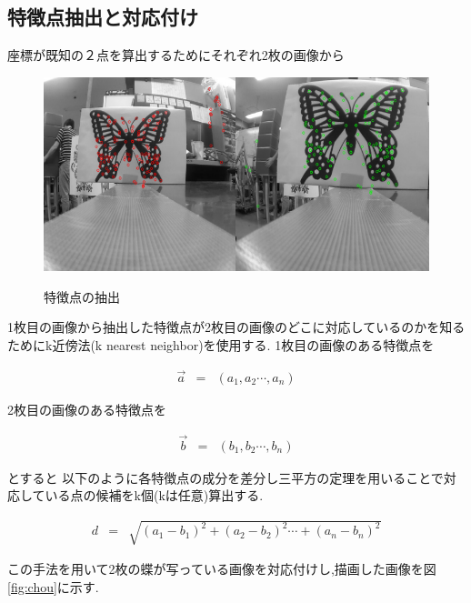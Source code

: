 \documentclass[12pt,oneside]{sotsuken_paper}
\begin{document}
\subsection{特徴点抽出と対応付け}
座標が既知の２点を算出するためにそれぞれ2枚の画像から

\begin{figure}[htp]
 \begin{center}
  \includegraphics[width=120mm]{img/soft/surf.png}
 　\caption{特徴点の抽出}
  \label{fig:surf}%
 \end{center}
\end{figure}

1枚目の画像から抽出した特徴点が2枚目の画像のどこに対応しているのかを知るためにk近傍法(k nearest neighbor)を使用する.
1枚目の画像のある特徴点を

\begin{eqnarray}
	\vec{a}  & = & (a_1, a_2 \cdots, a_n)
\end{eqnarray}

2枚目の画像のある特徴点を

\begin{eqnarray}
	\vec{b}  & = & (b_1, b_2 \cdots, b_n)
\end{eqnarray}

とすると
以下のように各特徴点の成分を差分し三平方の定理を用いることで対応している点の候補をk個(kは任意)算出する.


\begin{eqnarray}
	d & = & \sqrt{(a_1-b_1)^2+ (a_2-b_2)^2 \cdots+ (a_n-b_n)^2}
\end{eqnarray}

この手法を用いて2枚の蝶が写っている画像を対応付けし,描画した画像を図\ref{fig:chou}に示す.
\end{document}
